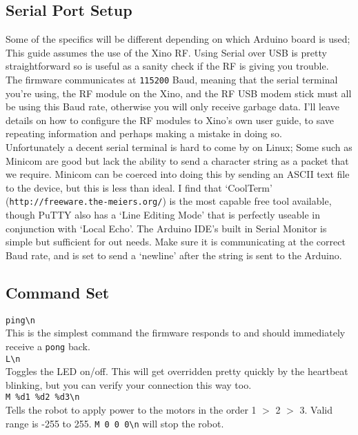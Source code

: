 \subsection{Serial Port Setup}

Some of the specifics will be different depending on which Arduino board is used; This guide assumes the use of the Xino RF. Using Serial over USB is pretty straightforward so is useful as a sanity check if the RF is giving you trouble.\\

The firmware communicates at \texttt{115200} Baud, meaning that the serial terminal you're using, the RF module on the Xino, and the RF USB modem stick must all be using this Baud rate, otherwise you will only receive garbage data. I'll leave details on how to configure the RF modules to Xino's own user guide, to save repeating information and perhaps making a mistake in doing so.\\

Unfortunately a decent serial terminal is hard to come by on Linux; Some such as Minicom are good but lack the ability to send a character string as a packet that we require. Minicom can be coerced into doing this by sending an ASCII text file to the device, but this is less than ideal. I find that `CoolTerm' (\texttt{http://freeware.the-meiers.org/}) is the most capable free tool available, though PuTTY also has a `Line Editing Mode' that is perfectly useable in conjunction with `Local Echo'. The Arduino IDE's built in Serial Monitor is simple but sufficient for out needs. Make sure it is communicating at the correct Baud rate, and is set to send a `newline' after the string is sent to the Arduino.

\subsection{Command Set}


\verb|ping\n|\\
This is the simplest command the firmware responds to and should immediately receive a \verb|pong| back.\\


\verb|L\n|\\
Toggles the LED on/off. This will get overridden pretty quickly by the heartbeat blinking, but you can verify your connection this way too.\\


\verb|M %d1 %d2 %d3\n|\\
Tells the robot to apply power to the motors in the order 1 $>$ 2 $>$ 3. Valid range is -255 to 255. \verb|M 0 0 0\n| will stop the robot.

